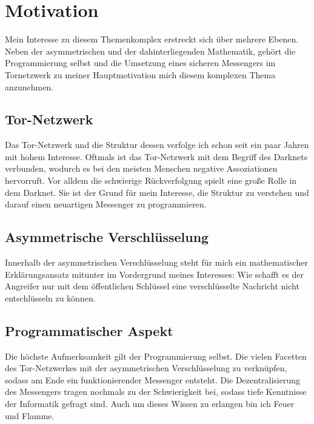 \documentclass[a4paper,10pt,ngerman,
  headheight=28pt,]{scrartcl}
\begin{document}


\setcounter{page}{0}
\tableofcontents

\vspace{0.5cm}
\pagebreak

\linenumbers
\modulolinenumbers[5]

\section{Motivation}
Mein Interesse zu diesem Themenkomplex erstreckt sich über mehrere Ebenen. Neben der asymmetrischen und der dahinterliegenden Mathematik, gehört die Programmierung selbst und die Umsetzung eines sicheren Messengers im Tornetzwerk zu meiner Hauptmotivation mich diesem komplexen Thema anzunehmen.
\subsection{Tor-Netzwerk}
Das Tor-Netzwerk und die Struktur dessen verfolge ich schon seit ein paar Jahren mit hohem Interesse. Oftmals ist das Tor-Netzwerk mit dem Begriff des Darknets verbunden, wodurch es bei den meisten Menschen negative Assoziationen hervorruft. Vor alldem die schwierige Rückverfolgung spielt eine große Rolle in dem Darknet. Sie ist der Grund für mein Interesse, die Struktur zu verstehen und darauf einen neuartigen Messenger zu programmieren.

\subsection{Asymmetrische Verschlüsselung}
Innerhalb der asymmetrischen Verschlüsselung steht für mich ein mathematischer Erklärungsansatz mitunter im Vordergrund meines Interesses: \glqq Wie schafft es der Angreifer nur mit dem öffentlichen Schlüssel eine verschlüsselte Nachricht nicht entschlüsseln zu können\grqq.

\subsection{Programmatischer Aspekt}
Die höchste Aufmerksamkeit gilt der Programmierung selbst. Die vielen Facetten des Tor-Netzwerkes mit der asymmetrischen Verschlüsselung zu verknüpfen, sodass am Ende ein funktionierender Messenger entsteht. Die Dezentralisierung des Messengers tragen nochmals zu der Schwierigkeit bei, sodass tiefe Kenntnisse der Informatik gefragt sind. Auch um dieses Wissen zu erlangen bin ich Feuer und Flamme.
\end{document}

